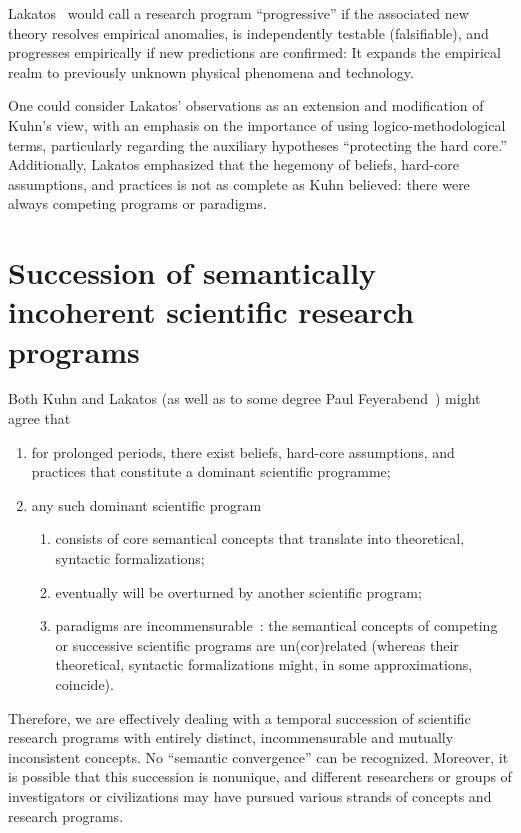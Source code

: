 Lakatos~\cite{lakatosch,lakatos_1978} would call a research program ``progressive'' if the associated new theory resolves empirical anomalies, is independently testable (falsifiable), and progresses empirically if new predictions are confirmed: It expands the empirical realm to previously unknown physical phenomena and technology.

One could consider Lakatos' observations as an extension and modification of Kuhn's view, with an emphasis on the importance of using logico-methodological terms, particularly regarding the auxiliary hypotheses ``protecting the hard core.'' Additionally, Lakatos emphasized that the hegemony of beliefs, hard-core assumptions, and practices is not as complete as Kuhn believed: there were always competing programs or paradigms.


\section{Succession of semantically incoherent scientific research programs}

Both Kuhn and Lakatos (as well as to some degree Paul Feyerabend~\cite{feyerabend,fey-philpapers1,fey-philpapers2}) might agree that
\begin{enumerate}
\item
for prolonged periods, there exist beliefs, hard-core assumptions, and practices that constitute a dominant scientific programme;
\item
any such dominant scientific program
\begin{enumerate}
\item
consists of core semantical concepts that translate into theoretical, syntactic formalizations;
\item
eventually will be overturned by another scientific program;
\item
paradigms are incommensurable~\cite{sep-incommensurability}:
the semantical concepts of competing or successive scientific programs are un(cor)related (whereas their theoretical, syntactic formalizations might, in some approximations, coincide).
\end{enumerate}
\end{enumerate}

Therefore, we are effectively dealing with a temporal succession of scientific research programs with entirely distinct, incommensurable and mutually inconsistent
concepts. No ``semantic convergence'' can be recognized.
Moreover, it is possible that this succession is nonunique, and different researchers or groups of investigators or civilizations may have pursued various strands of concepts and research programs.

